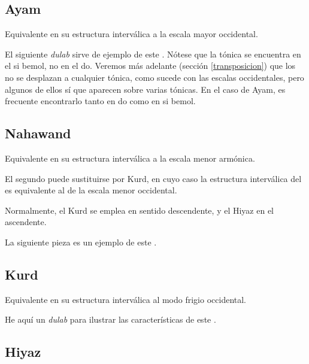 \subsection{\Maqam Ayam}

Equivalente en su estructura interválica a la escala mayor occidental.



El siguiente \emph{dulab} sirve de ejemplo de este \maqamb. Nótese que la tónica se encuentra en el si bemol, no en el do. Veremos más adelante (sección \ref{transposicion}) que los \maqam no se desplazan a cualquier tónica, como sucede con las escalas occidentales, pero algunos de ellos sí que aparecen sobre varias tónicas. En el caso de \maqam Ayam, es frecuente encontrarlo tanto en do como en si bemol.



\subsection{\Maqam Nahawand}

Equivalente en su estructura interválica a la escala menor armónica.



El segundo \yins puede sustituirse por \yins Kurd, en cuyo caso la estructura interválica del \maqam es equivalente al de la escala menor occidental.



Normalmente, el \yins Kurd se emplea en sentido descendente, y el \yins Hiyaz en el ascendente.

La siguiente pieza es un ejemplo de este \maqamb.



\subsection{\Maqam Kurd}

Equivalente en su estructura interválica al modo frigio occidental.



He aquí un \emph{dulab} para ilustrar las características de este \maqamb.



\subsection{\Maqam Hiyaz}


